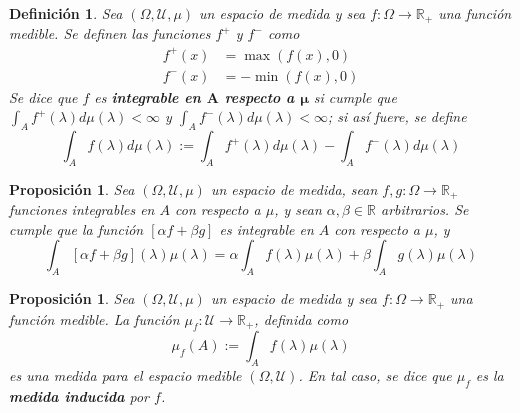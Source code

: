 \documentclass[12pt,letterpaper]{book}
\newtheorem{definicion}{Definición}[chapter]
\newtheorem{proposicion}[teorema]{Proposición}
\newcommand{\R}{\mathbb{R}}
\begin{document}
\begin{definicion}
Sea $(\Omega, \mathcal{U}, \mu)$ un espacio de medida y sea $f:\Omega \rightarrow \R_+$ una función medible. Se definen las funciones $f^{+}$ y $f^{-}$ como
\begin{align*}
f^{+}(x) &= \max (f(x), 0 ) \\
f^{-}(x) &= -\min (f(x), 0 )
\end{align*}
Se dice que $f$ es \textbf{integrable en $\boldsymbol{A}$ respecto a $\boldsymbol{\mu}$} si cumple que $\int_A f^{+}(\lambda) d\mu(\lambda) < \infty$ y $\int_A f^{-}(\lambda) d\mu(\lambda) < \infty$; si así fuere, se define
\begin{equation}
\int_A f(\lambda) d\mu(\lambda) := \int_A f^{+}(\lambda) d\mu(\lambda) - \int_A f^{-}(\lambda) d\mu(\lambda)
\end{equation}
\label{def:lazy2}
\end{definicion}

\begin{proposicion}
Sea $(\Omega, \mathcal{U}, \mu)$ un espacio de medida, sean $f,g:\Omega \rightarrow \R_+$ funciones integrables en $A$ con respecto a $\mu$, y sean $\alpha, \beta \in \R$ arbitrarios. 
%
Se cumple que la función $[\alpha f + \beta g]$ es integrable en $A$ con respecto a $\mu$, y
\begin{equation}
\int_A \left[ \alpha f + \beta g \right] (\lambda) \mu(\lambda) = \alpha \int_A f(\lambda) \mu(\lambda) + \beta \int_A g(\lambda) \mu(\lambda)
\end{equation}
\end{proposicion}

\begin{proposicion}
Sea $(\Omega, \mathcal{U}, \mu)$ un espacio de medida y sea $f:\Omega \rightarrow \R_+$ una función medible. La función $\mu_f:\mathcal{U}\rightarrow\R_+$, definida como
\begin{equation}
\mu_f(A) := \int_A f(\lambda) \mu(\lambda)
\end{equation}
es una medida para el espacio medible $(\Omega, \mathcal{U})$. En tal caso, se dice que $\mu_f$ es la \textbf{medida inducida} por $f$.
\end{proposicion}

\end{document}
